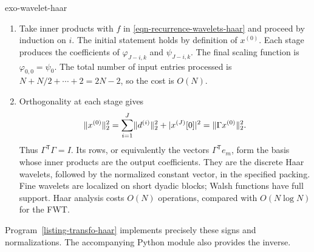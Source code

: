 \begin{correction}{exo-wavelet-haar}
\begin{enumerate}
\[
 \sum_kx^{(i)}[k]=2^{-i/2}\sum_kx^{(0)}[k],
 \qquad x^{(J)}[0]=2^{-J/2}\sum_kx^{(0)}[k].
\]
Since the input has $2^J$ entries, the last expression is
$2^{J/2}\operatorname{mean}(x^{(0)})$.
\item Take inner products with $f$ in
\eqref{eqn-recurrence-wavelets-haar} and proceed by induction on $i$.
The initial statement holds by definition of $x^{(0)}$.
Each stage produces the coefficients of $\varphi_{J-i,k}$ and
$\psi_{J-i,k}$. The final scaling function is $\varphi_{0,0}=\psi_0$.
The total number of input entries processed is
$N+N/2+\cdots+2=2N-2$, so the cost is $O(N)$.
\item Orthogonality at each stage gives
\[
 \lVert x^{(0)}\rVert_2^2
 =\sum_{i=1}^J\lVert d^{(i)}\rVert_2^2+|x^{(J)}[0]|^2
 =\lVert\Gamma x^{(0)}\rVert_2^2.
\]
Thus $\Gamma^{\mathsf T}\Gamma=I$. Its rows, or equivalently the vectors
$\Gamma^{\mathsf T}e_m$, form the basis whose inner products are the output
coefficients. They are the discrete Haar wavelets, followed by the normalized
constant vector, in the specified packing. Fine wavelets are localized on
short dyadic blocks; Walsh functions have full support. Haar analysis costs
$O(N)$ operations, compared with $O(N\log N)$ for the FWT.
\end{enumerate}
Program~\ref{listing-transfo-haar} implements precisely these signs and
normalizations. The accompanying Python module also provides the inverse.
\begin{listing}[H]
\caption{Orthonormal Haar analysis, with details stored from fine to coarse.}
\label{listing-transfo-haar}
\end{listing}
\end{correction}

